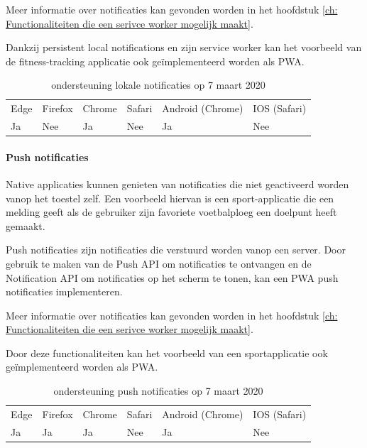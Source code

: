 Meer informatie over notificaties kan gevonden worden in het hoofdstuk \ref{ch: Functionaliteiten die een serivce worker mogelijk maakt}.

Dankzij persistent local notifications en zijn service worker kan het voorbeeld van de fitness-tracking applicatie ook geïmplementeerd worden als PWA.

\begin{table}[H]
	\centering
	\begin{tabular}{llllll}
		Edge & Firefox & Chrome & Safari & Android (Chrome) & IOS (Safari) \\
		Ja   & Nee      &  Ja     & Nee     & Ja               & Nee          
	\end{tabular}	
	\caption{ondersteuning lokale notificaties op 7 maart 2020}
\end{table}

\paragraph{Push notificaties}

Native applicaties kunnen genieten van notificaties die niet geactiveerd worden vanop het toestel zelf. Een voorbeeld hiervan is een sport-applicatie die een melding geeft als de gebruiker zijn favoriete voetbalploeg een doelpunt heeft gemaakt.

Push notificaties zijn notificaties die verstuurd worden vanop een server. Door gebruik te maken van de Push API \autocite{Sullivan2020} om notificaties te ontvangen en de Notification API om notificaties op het scherm te tonen, kan een PWA push notificaties implementeren. 

Meer informatie over notificaties kan gevonden worden in het hoofdstuk \ref{ch: Functionaliteiten die een serivce worker mogelijk maakt}.

Door deze functionaliteiten kan het voorbeeld van een sportapplicatie ook geïmplementeerd worden als PWA.

\begin{table}[H]
	\centering
	\begin{tabular}{llllll}
		Edge & Firefox & Chrome & Safari & Android (Chrome) & IOS (Safari) \\
		Ja   & Ja      &  Ja     & Nee     & Ja               & Nee          
	\end{tabular}	
	\caption{ondersteuning push notificaties op 7 maart 2020}
\end{table}



